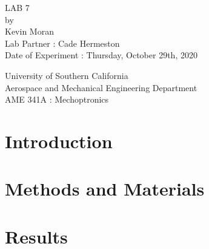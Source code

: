\documentclass[letterpaper,12pt]{article}
\begin{document}
\begin{titlepage}
 \begin{center}
 \vspace*{1in}
{\Huge LAB 7}\\
    \bigskip
    by\\
    \bigskip
    {\Large Kevin Moran} \\
    \bigskip
    Lab Partner : Cade Hermeston\\
    Date of Experiment : Thursday, October 29th, 2020

    \bigskip\bigskip\bigskip
    University of Southern California\\
    Aerospace and Mechanical Engineering Department\\
    AME 341A : Mechoptronics
 \end{center}
\end{titlepage}
\begin{abstract}
    
\end{abstract}

\section{Introduction}

\section{Methods and Materials}

\section{Results}
\end{document}
